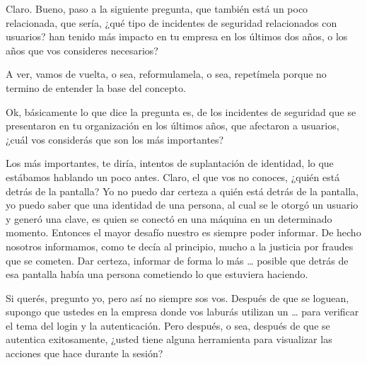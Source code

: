 \begin{description}[leftmargin=0cm, labelsep=0.5cm]
    \item[\textbf{MUNTAABSKI FEDERICO:}] Claro. Bueno, paso a la siguiente pregunta, que también está un poco relacionada, que sería, ¿qué tipo de incidentes de seguridad relacionados con usuarios? han tenido más impacto en tu empresa en los últimos dos años, o los años que vos consideres necesarios?

    \item[\textbf{PITA GUILLERMO:}] A ver, vamos de vuelta, o sea, reformulamela, o sea, repetímela porque no termino de entender la base del concepto.

    \item[\textbf{MUNTAABSKI FEDERICO:}] Ok, básicamente lo que dice la pregunta es, de los incidentes de seguridad que se presentaron en tu organización en los últimos años, que afectaron a usuarios, ¿cuál vos considerás que son los más importantes?

    \item[\textbf{PITA GUILLERMO:}] Los más importantes, te diría, intentos de suplantación de identidad, lo que estábamos hablando un poco antes. Claro, el que vos no conoces, ¿quién está detrás de la pantalla? Yo no puedo dar certeza a quién está detrás de la pantalla, yo puedo saber que una identidad de una persona, al cual se le otorgó un usuario y generó una clave, es quien se conectó en una máquina en un determinado momento. Entonces el mayor desafío nuestro es siempre poder informar. De hecho nosotros informamos, como te decía al principio, mucho a la justicia por fraudes que se cometen. Dar certeza, informar de forma lo más … posible que detrás de esa pantalla había una persona cometiendo lo que estuviera haciendo.

    \item[\textbf{MOCIULSKY SANTIAGO:}] Si querés, pregunto yo, pero así no siempre sos vos. Después de que se loguean, supongo que ustedes en la empresa donde vos laburás utilizan un … para verificar el tema del login y la autenticación. Pero después, o sea, después de que se autentica exitosamente, ¿usted tiene alguna herramienta para visualizar las acciones que hace durante la sesión?


\end{description}
